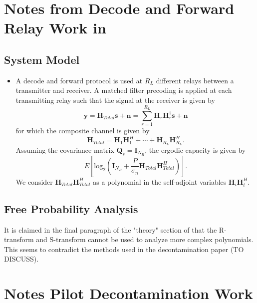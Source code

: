 \documentclass[12pt,a4paper]{report}
\begin{document}
\section{Notes from Decode and Forward Relay Work in \cite{hadley2019capacity}}\label{relay}
\subsection{System Model}

\begin{itemize}
\item A decode and forward protocol is used at $R_L$ different relays between a transmitter and receiver. A matched filter precoding is applied at each transmitting relay such that the signal at the receiver is given by 
\begin{equation}
\mathbf{y} = \mathbf{H}_{Total} \mathbf{s} +  \mathbf{n} = \sum_{r=1}^{R_L} \mathbf{H}_{r}\mathbf{H}_{r}^{\dagger}\mathbf{s} +  \mathbf{n}
\end{equation}
for which the composite channel is given by 
\begin{equation}
\mathbf{H}_{Total} = \mathbf{H}_{1}\mathbf{H}_{1}^{H} +\cdots +\mathbf{H}_{R_L}\mathbf{H}_{R_L}^{H}.
\end{equation}
Assuming the covariance matrix $\mathbf{Q}_s = \mathbf{I}_{N_R}$, the ergodic capacity is given by 
\begin{equation}\label{ergodic_capacity}
E\left[\text{log}_2(\mathbf{I}_{N_R} + \frac{P}{\sigma_n}\mathbf{H}_{Total}\mathbf{H}_{Total}^H)\right].
\end{equation}
We consider $\mathbf{H}_{Total}\mathbf{H}_{Total}^H$ as a polynomial in the self-adjoint variables $\mathbf{H}_{i}\mathbf{H}_{i}^{H}$.
\end{itemize}
\subsection{Free Probability Analysis}
It is claimed in the final paragraph of the "theory" section of \cite{hadley2019capacity} that the R-transform and S-transform cannot be used to analyze more complex polynomials. This seems to contradict the methods used in the decontamination paper (TO DISCUSS). 


\section{Notes Pilot Decontamination Work}
\end{document}
